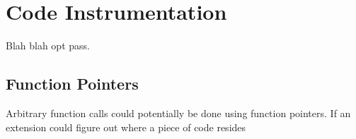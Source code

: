 \chapter {Code Instrumentation}

Blah blah opt pass.

\section {Function Pointers}

Arbitrary function calls could potentially be done using function pointers. If
an extension could figure out where a piece of code resides

